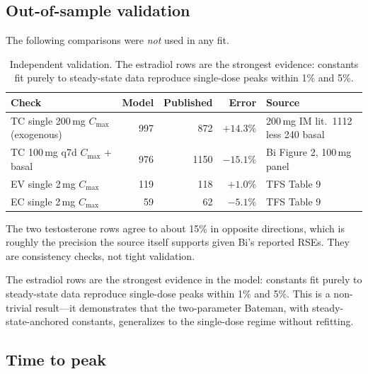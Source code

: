 \documentclass[11pt,a4paper]{article}
\newcommand{\good}[1]{\textcolor{ok}{#1}}
\begin{document}
\subsection{Out-of-sample validation}
\label{sec:out_of_sample}

The following comparisons were \emph{not} used in any fit.

\begin{table}[h]
\centering
\footnotesize
\begin{tabular}{@{}lrrrl@{}}
\toprule
\textbf{Check} & \textbf{Model} & \textbf{Published} & \textbf{Error} & \textbf{Source} \\
\midrule
TC single 200\,mg $C_{\max}$ (exogenous) & 997 & 872 & $+14.3\%$
  & 200\,mg IM lit.\ 1112 less 240 basal \\
TC 100\,mg q7d $C_{\max}$ + basal & 976 & 1150 & $-15.1\%$
  & Bi Figure 2, 100\,mg panel \\
EV single 2\,mg $C_{\max}$ & 119 & 118 & \good{$+1.0\%$} & TFS Table 9 \\
EC single 2\,mg $C_{\max}$ & 59 & 62 & \good{$-5.1\%$} & TFS Table 9 \\
\bottomrule
\end{tabular}
\caption{Independent validation. The estradiol rows are the strongest
evidence: constants fit purely to steady-state data reproduce
single-dose peaks within 1\% and 5\%.}
\label{tab:out_of_sample}
\end{table}

The two testosterone rows agree to about 15\% in opposite directions,
which is roughly the precision the source itself supports given Bi's
reported RSEs. They are consistency checks, not tight validation.

The estradiol rows are the strongest evidence in the model: constants
fit purely to steady-state data reproduce single-dose peaks within 1\%
and 5\%. This is a non-trivial result---it demonstrates that the
two-parameter Bateman, with steady-state-anchored constants, generalizes
to the single-dose regime without refitting.

\subsection{Time to peak}
\label{sec:tmax_results}
\end{document}
